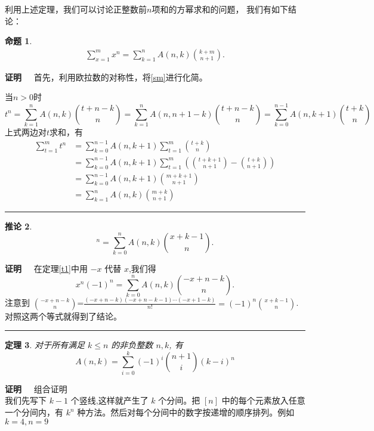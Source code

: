 \documentclass[a4paper,11pt,twoside]{book}
\newtheorem{thm}{定理}[section]
\newtheorem{prop}[thm]{命题}
\newtheorem{coro}[thm]{推论}
\def\qed{\nopagebreak\hfill{\rule{4pt}{7pt}}\medbreak}
\def\pf{{\bf 证明~~ }}
\begin{document}
利用上述定理，我们可以讨论正整数前$n$项和的方幂求和的问题，
我们有如下结论：

\begin{prop}
\begin{align}
\sum_{x=1}^mx^n=\sum_{k=1}^{n}A(n,k){k+m\choose n+1}.
\end{align}
\end{prop}

\pf 首先，利用欧拉数的对称性，将\eqref{sm}进行化简。

当$n>0$时 \[t^n=\sum_{k=1}^{n}A(n,k){t+n-k \choose
n}=\sum_{k=1}^{n}A(n,n+1-k){t+n-k \choose
n}=\sum_{k=0}^{n-1}A(n,k+1){t+k \choose n}
\]
上式两边对$t$求和，有
\begin{align*}
\sum_{t=1}^mt^n &=\sum_{k=0}^{n-1}A(n,k+1)\sum_{t=1}^m{t+k \choose n}\\
                &=\sum_{k=0}^{n-1}A(n,k+1)\sum_{t=1}^m \left({t+k+1\choose n+1}-{t+k\choose n+1}\right)\\
                &=\sum_{k=0}^{n-1}A(n,k+1){m+k+1\choose n+1}\\
                &=\sum_{k=1}^{n}A(n,k){m+k\choose n+1}
\end{align*}
\qed



\begin{coro}
\begin{equation}
[x]^n=\sum_{k=0}^{n}A(n,k){x+k-1\choose n}.
\end{equation}
\end{coro}
\pf
 在定理\ref{t1}中用 $-x$ 代替 $x$,我们得
 $$x^n(-1)^n=\sum_{k=0}^{n}A(n,k){-x+n-k\choose n}.$$
 注意到 ${-x+n-k \choose n}$=$\frac{(-x+n-k)(-x+n-k-1)\cdots
(-x+1-k)}{n!}=(-1)^n{x+k-1 \choose
 n}$. 对照这两个等式就得到了结论。\qed

\begin{thm}
对于所有满足 $k\leq n$ 的非负整数 $n,k$, 有
\begin{equation}
A(n,k)=\sum_{i=0}^{k}(-1)^i{n+1 \choose i}(k-i)^n
\end{equation}
\end{thm}

\pf {组合证明}\\
我们先写下 $k-1$ 个竖线,这样就产生了 $k$ 个分间。把 $[n]$
中的每个元素放入任意一个分间内，有 $k^n$
种方法。然后对每个分间中的数字按递增的顺序排列。例如 $k=4,n=9$
\end{document}
